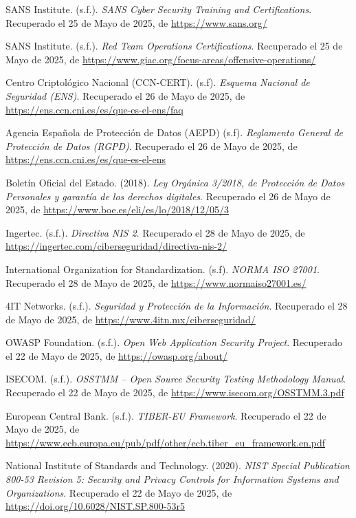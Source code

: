 \documentclass[a4paper, 11pt]{article}
\begin{document}
\begin{thebibliography}{99}
    SANS Institute. (s.f.). \textit{SANS Cyber Security Training and Certifications}. Recuperado el 25 de Mayo de 2025, de \url{https://www.sans.org/}

    SANS Institute. (s.f.). \textit{Red Team Operations Certifications}. Recuperado el 25 de Mayo de 2025, de \url{https://www.giac.org/focus-areas/offensive-operations/}

    Centro Criptológico Nacional (CCN-CERT). (s.f). \textit{Esquema Nacional de Seguridad (ENS)}. Recuperado el 26 de Mayo de 2025, de \url{https://ens.ccn.cni.es/es/que-es-el-ens/faq}

    Agencia Española de Protección de Datos (AEPD) (s.f). \textit{Reglamento General de Protección de Datos (RGPD)}. Recuperado el 26 de Mayo de 2025, de \url{https://ens.ccn.cni.es/es/que-es-el-ens}

    Boletín Oficial del Estado. (2018). \textit{Ley Orgánica 3/2018, de Protección de Datos Personales y garantía de los derechos digitales}. Recuperado el 26 de Mayo de 2025, de \url{https://www.boe.es/eli/es/lo/2018/12/05/3}

    Ingertec. (s.f.). \textit{Directiva NIS 2}. Recuperado el 28 de Mayo de 2025, de \url{https://ingertec.com/ciberseguridad/directiva-nis-2/}

    International Organization for Standardization. (s.f). \textit{NORMA ISO 27001}. Recuperado el 28 de Mayo de 2025, de \url{https://www.normaiso27001.es/}

    4IT Networks. (s.f.). \textit{Seguridad y Protección de la Información}. Recuperado el 28 de Mayo de 2025, de \url{https://www.4itn.mx/ciberseguridad/}

    OWASP Foundation. (s.f.). \textit{Open Web Application Security Project}. Recuperado el 22 de Mayo de 2025, de \url{https://owasp.org/about/}

    ISECOM. (s.f.). \textit{OSSTMM – Open Source Security Testing Methodology Manual}. Recuperado el 22 de Mayo de 2025, de \url{https://www.isecom.org/OSSTMM.3.pdf}

    European Central Bank. (s.f.). \textit{TIBER-EU Framework}. Recuperado el 22 de Mayo de 2025, de \url{https://www.ecb.europa.eu/pub/pdf/other/ecb.tiber_eu_framework.en.pdf}

    National Institute of Standards and Technology. (2020). \textit{NIST Special Publication 800-53 Revision 5: Security and Privacy Controls for Information Systems and Organizations}. Recuperado el 22 de Mayo de 2025, de \url{https://doi.org/10.6028/NIST.SP.800-53r5}


\end{thebibliography}
\end{document}
